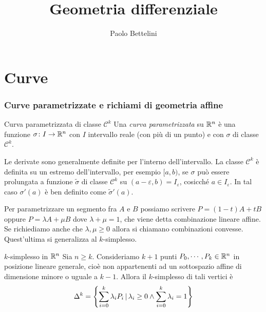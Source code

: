 \documentclass[a4paper]{article}
\title{Geometria differenziale}
\author{Paolo Bettelini}
\date{}
\begin{document}
\maketitle
\tableofcontents

\part{Curve}

\section{Curve parametrizzate e richiami di geometria affine}

\begin{snippetdefinition}{Curva parametrizzata di classe \(\mathcal C^k\)}
    Una \emph{curva parametrizzata} su \(\mathbb{R}^n\)
    è una funzione \(\sigma \colon I \to \mathbb{R}^n\)
    con \(I\) intervallo reale (con più di un punto)
    e con \(\sigma\) di classe \(\mathcal C^k\).
\end{snippetdefinition}

Le derivate sono generalmente definite per l'interno dell'intervallo.
La classe \(\mathcal C^k\) è definita su un estremo dell'intervallo, per esempio \([a,b)\),
se \(\sigma\) può essere prolungata a funzione \(\tilde \sigma\)
di classe \(\mathcal C^k\) su \((a- \varepsilon, b) = I_\varepsilon\),
cosicché \(a \in I_\varepsilon\).
In tal caso \(\sigma'(a)\) è ben definito come \(\tilde \sigma'(a)\).

Per parametrizzare un segmento fra \(A\) e \(B\)
possiamo scrivere \(P = (1-t)A + tB\) oppure \(P = \lambda A + \mu B\)
dove \(\lambda + \mu = 1\), che viene detta combinazione lineare affine.
Se richiediamo anche che \(\lambda,\mu \geq 0\) allora si chiamano combinazioni convesse.
Quest'ultima si generalizza al \(k\)-simplesso.

\begin{snippetdefinition}{\(k\)-simplesso in \(\mathbb{R}^n\)}
    Sia \(n \geq k\).
    Consideriamo \(k + 1\) punti \(P_0, \cdots, P_k \in \mathbb{R}^n\)
    in posizione lineare generale, cioè
    non appartenenti ad un sottospazio affine di dimensione minore o uguale a \(k-1\).
    Allora il \(k\)-simplesso di tali vertici è
    \[
        \Delta^k = \left\{
            \sum_{i=0}^k \lambda_i P_i
            \,|\,
            \lambda_i \geq 0 \land \sum_{i=0}^k \lambda_i = 1
        \right\}
    \] 
\end{snippetdefinition}
\end{document}
